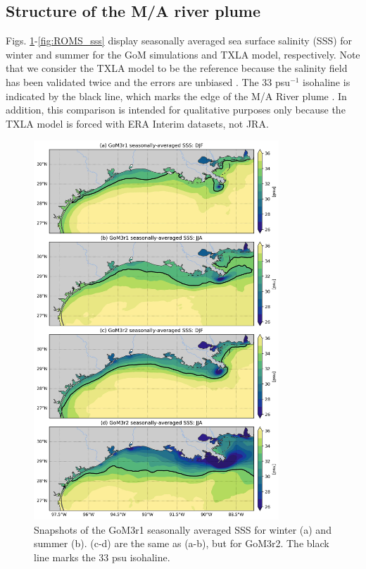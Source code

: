 \subsection{Structure of the M/A river plume}
Figs. \ref{fig:mpaso_sss}-\ref{fig:ROMS_sss} display seasonally averaged sea surface salinity (SSS) for winter and summer for the GoM simulations and TXLA model, respectively. Note that we consider the TXLA model to be the reference because the salinity field has been validated twice and the errors are unbiased \citep{Kobashi_2020, Zhang_2012_numerical}. The 33 psu$^{-1}$ isohaline is indicated by the black line, which marks the edge of the M/A River plume \citep{hetland2012integrated, thyng2018seasonal}. In addition, this comparison is intended for qualitative purposes only because the TXLA model is forced with ERA Interim datasets, not JRA.

\begin{figure}
\centerline{\includegraphics[width=0.82\textwidth]{figures/scgsr/mpaso_sss_mean.jpg}}
    \caption{Snapshots of the GoM3r1 seasonally averaged SSS for winter (a) and summer (b). (c-d) are the same as (a-b), but for GoM3r2. The black line marks the 33 psu isohaline.}
    \label{fig:mpaso_sss}
\end{figure}

